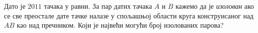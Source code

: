 Дато је $2011$ тачака у равни. За пар датих тачака $A$ и $B$ кажемо да је
\emph{изолован} ако се све преостале дате тачке налазе у спољашњој области
круга конструисаног над $AB$ као над пречником.
Који је највећи могући број изолованих парова?

\solution

